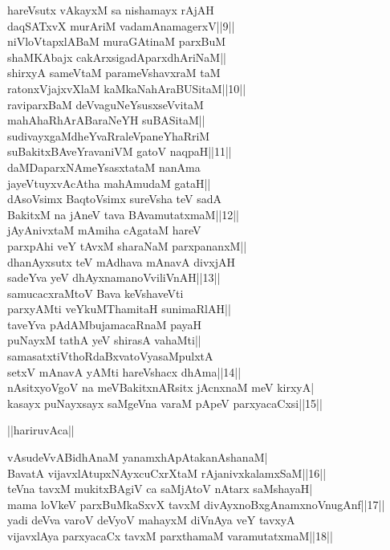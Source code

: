 \documentclass{article}
\begin{document}
hareVsutx vAkayxM sa nishamayx rAjAH\\
daqSATxvX murAriM vadamAnamagerxV||9||\\
niVloVtapxlABaM muraGAtinaM parxBuM\\
shaMKAbajx cakArxsigadAparxdhAriNaM||\\
shirxyA sameVtaM parameVshavxraM taM\\
ratonxVjajxvXlaM kaMkaNahAraBUSitaM||10||\\
raviparxBaM deVvaguNeYsusxseVvitaM\\
mahAhaRhArABaraNeYH suBASitaM||\\
sudivayxgaMdheYvaRraleVpaneYhaRriM\\
suBakitxBAveYravaniVM gatoV naqpaH||11||\\
daMDaparxNAmeYsasxtataM nanAma\\
jayeVtuyxvAcAtha mahAmudaM gataH||\\
dAsoVsimx BaqtoVsimx sureVsha teV sadA\\
BakitxM na jAneV tava BAvamutatxmaM||12||\\
jAyAnivxtaM mAmiha cAgataM hareV\\
parxpAhi veY tAvxM sharaNaM parxpananxM||\\
dhanAyxsutx teV mAdhava mAnavA divxjAH\\
sadeYva yeV dhAyxnamanoVviliVnAH||13||\\
samucacxraMtoV Bava keVshaveVti\\
parxyAMti veYkuMThamitaH sunimaRlAH||\\
taveYva pAdAMbujamacaRnaM payaH\\
puNayxM tathA yeV shirasA vahaMti||\\
samasatxtiVthoRdaBxvatoVyasaMpulxtA\\
setxV mAnavA yAMti hareVshacx dhAma||14||\\
nAsitxyoVgoV na meVBakitxnARsitx jAcnxnaM meV kirxyA|\\
kasayx puNayxsayx saMgeVna varaM pApeV parxyacaCxsi||15||\\

\begin{center}
||hariruvAca||
\end{center}

vAsudeVvABidhAnaM yanamxhApAtakanAshanaM|\\
BavatA vijavxlAtupxNAyxcuCxrXtaM rAjanivxkalamxSaM||16||\\
teVna tavxM mukitxBAgiV ca saMjAtoV nAtarx saMshayaH|\\
mama loVkeV parxBuMkaSxvX tavxM divAyxnoBxgAnamxnoVnugAnf||17||\\
yadi deVva varoV deVyoV mahayxM diVnAya veY tavxyA\\
vijavxlAya parxyacaCx tavxM parxthamaM varamutatxmaM||18||\\
\end{document}

